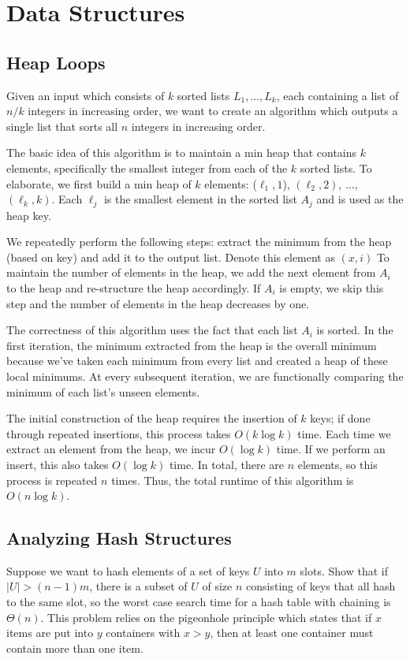 \documentclass[11pt]{article}
\begin{document}
\section{Data Structures}

\subsection{Heap Loops} 
Given an input which consists of $k$ sorted lists $L_1, \dots, L_k$, each containing a list of $n/k$ integers in increasing order, we want to create an algorithm which outputs a single list that sorts all $n$ integers in increasing order. 

The basic idea of this algorithm is to maintain a min heap that contains $k$ elements, specifically the smallest integer from each of the $k$ sorted lists. To elaborate, we first build a min heap of $k$ elements: ($\ell_1, 1$), $(\ell_2, 2)$, $\dots$, $(\ell_k, k)$. Each $\ell_j$ is the smallest element in the sorted list $A_j$ and is used as the heap key. 

We repeatedly perform the following steps: extract the minimum from the heap (based on key) and add it to the output list. Denote this element as $(x, i)$ To maintain the number of elements in the heap, we add the next element from $A_i$ to the heap and re-structure the heap accordingly. If $A_i$ is empty, we skip this step and the number of elements in the heap decreases by one. 

The correctness of this algorithm uses the fact that each list $A_i$ is sorted. In the first iteration, the minimum extracted from the heap is the overall minimum because we've taken each minimum from every list and created a heap of these local minimums. At every subsequent iteration, we are functionally comparing the minimum of each list's unseen elements. 

The initial construction of the heap requires the insertion of $k$ keys; if done through repeated insertions, this process takes $O(k \log k)$ time. Each time we extract an element from the heap, we incur $O(\log k)$ time. If we perform an insert, this also takes $O(\log k)$ time. In total, there are $n$ elements, so this process is repeated $n$ times. Thus, the total runtime of this algorithm is $O(n \log k)$. 

\subsection{Analyzing Hash Structures}
Suppose we want to hash elements of a set of keys $U$ into $m$ slots. Show that if $|U| > (n-1)m$, there is a subset of $U$ of size $n$ consisting of keys that all hash to the same slot, so the worst case search time for a hash table with chaining is $\Theta(n)$. This problem relies on the pigeonhole principle which states that if $x$ items are put into $y$ containers with $x > y$, then at least one container must contain more than one item. 
\end{document}
